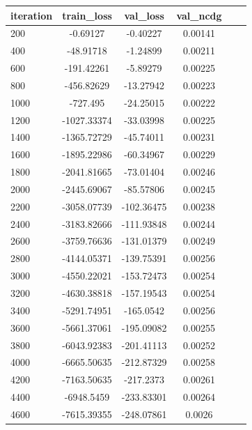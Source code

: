 \documentclass[hyperref,a4paper,UTF8]{ctexart}
\begin{document}
\begin{table}[ht]
    \centering
    \begin{tabular}{l|c|c|c|c|c|}
        \toprule
        iteration & train\_loss  & val\_loss   & val\_ncdg \\
        \hline  %
        200       & -0.69127     & -0.40227    & 0.00141   \\
        400       & -48.91718    & -1.24899    & 0.00211   \\
        600       & -191.42261   & -5.89279    & 0.00225   \\
        800       & -456.82629   & -13.27942   & 0.00223   \\
        1000      & -727.495     & -24.25015   & 0.00222   \\
        1200      & -1027.33374  & -33.03998   & 0.00225   \\
        1400      & -1365.72729  & -45.74011   & 0.00231   \\
        1600      & -1895.22986  & -60.34967   & 0.00229   \\
        1800      & -2041.81665  & -73.01404   & 0.00246   \\
        2000      & -2445.69067  & -85.57806   & 0.00245   \\
        2200      & -3058.07739  & -102.36475  & 0.00238   \\
        2400      & -3183.82666  & -111.93848  & 0.00244   \\
        2600      & -3759.76636  & -131.01379  & 0.00249   \\
        2800      & -4144.05371  & -139.75391  & 0.00256   \\
        3000      & -4550.22021  & -153.72473  & 0.00254   \\
        3200      & -4630.38818  & -157.19543  & 0.00254   \\
        3400      & -5291.74951  & -165.0542   & 0.00256   \\
        3600      & -5661.37061  & -195.09082  & 0.00255   \\
        3800      & -6043.92383  & -201.41113  & 0.00252   \\
        4000      & -6665.50635  & -212.87329  & 0.00258   \\
        4200      & -7163.50635  & -217.2373   & 0.00261   \\
        4400      & -6948.5459   & -233.83301  & 0.00264   \\
        4600      & -7615.39355  & -248.07861  & 0.0026    \\

\end{tabular}
\end{table}
\end{document}
